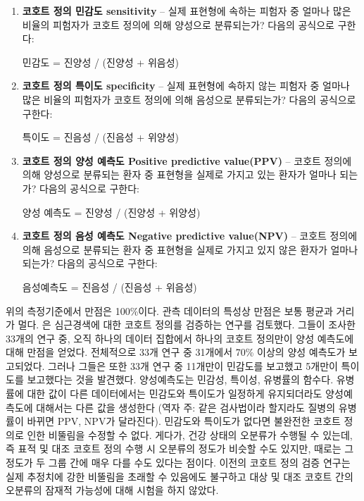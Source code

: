 \documentclass[10.5pt]{book}
\theoremstyle{definition}
\theoremstyle{definition}
\theoremstyle{definition}
\theoremstyle{remark}
\begin{document}
\begin{enumerate}
\def\labelenumi{\arabic{enumi}.}
\item
  \textbf{코호트 정의 민감도 sensitivity} -- 실제 표현형에 속하는 피험자
  중 얼마나 많은 비율의 피험자가 코호트 정의에 의해 양성으로 분류되는가?
  다음의 공식으로 구한다:

  민감도 = 진양성 / (진양성 + 위음성)
\item
  \textbf{코호트 정의 특이도 specificity} -- 실제 표현형에 속하지 않는
  피험자 중 얼마나 많은 비율의 피험자가 코호트 정의에 의해 음성으로
  분류되는가? 다음의 공식으로 구한다:

  특이도 = 진음성 / (진음성 + 위양성)
\item
  \textbf{코호트 정의 양성 예측도 Positive predictive value(PPV)} --
  코호트 정의에 의해 양성으로 분류되는 환자 중 표현형을 실제로 가지고
  있는 환자가 얼마나 되는가? 다음의 공식으로 구한다:

  양성 예측도 = 진양성 / (진양성 + 위양성)
\item
  \textbf{코호트 정의 음성 예측도 Negative predictive value(NPV)} --
  코호트 정의에 의해 음성으로 분류되는 환자 중 표현형을 실제로 가지고
  있지 않은 환자가 얼마나 되는가? 다음의 공식으로 구한다:

  음성예측도 = 진음성 / (진음성 + 위음성)
\end{enumerate}

위의 측정기준에서 만점은 100\%이다. 관측 데이터의 특성상 만점은 보통
평균과 거리가 멀다. \citet{Rubbo2015phenotypes} 은 심근경색에 대한
코호트 정의를 검증하는 연구를 검토했다. 그들이 조사한 33개의 연구 중,
오직 하나의 데이터 집합에서 하나의 코호트 정의만이 양성 예측도에 대해
만점을 얻었다. 전체적으로 33개 연구 중 31개에서 70\% 이상의 양성
예측도가 보고되었다. 그러나 그들은 또한 33개 연구 중 11개만이 민감도를
보고했고 5개만이 특이도를 보고했다는 것을 발견했다. 양성예측도는 민감성,
특이성, 유병률의 함수다. 유병률에 대한 값이 다른 데이터에서는 민감도와
특이도가 일정하게 유지되더라도 양성예측도에 대해서는 다른 값을 생성한다
(역자 주: 같은 검사법이라 할지라도 질병의 유병률이 바뀌면 PPV, NPV가
달라진다). 민감도와 특이도가 없다면 불완전한 코호트 정의로 인한 비뚤림을
수정할 수 없다. 게다가, 건강 상태의 오분류가 수행될 수 있는데, 즉 표적
및 대조 코호트 정의 수행 시 오분류의 정도가 비슷할 수도 있지만, 때로는
그 정도가 두 그룹 간에 매우 다를 수도 있다는 점이다. 이전의 코호트 정의
검증 연구는 실제 추정치에 강한 비뚤림을 초래할 수 있음에도 불구하고 대상
및 대조 코호트 간의 오분류의 잠재적 가능성에 대해 시험을 하지 않았다.
\end{document}
